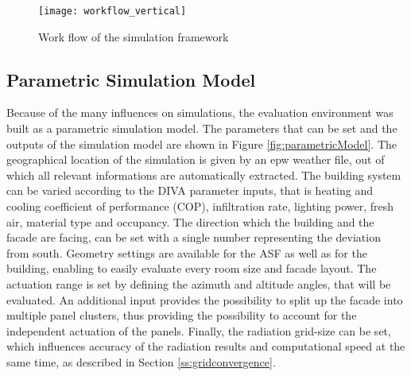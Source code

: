 
			\begin{figure}[ht] %
				\begin{center}
				\texttt{[image: workflow\_vertical]}
				\caption{Work flow of the simulation framework}
				\label{fig:workflow}
				\end{center} 
			\end{figure}

			

		\subsection{Parametric Simulation Model}

			Because of the many influences on simulations, the evaluation environment was built as a parametric simulation model. The parameters that can be set and the outputs of the simulation model are shown in Figure \ref{fig:parametricModel}. The geographical location of the simulation is given by an epw weather file, out of which all relevant informations are automatically extracted. The building system can be varied according to the DIVA parameter inputs, that is heating and cooling coefficient of performance (COP), infiltration rate, lighting power, fresh air, material type and occupancy. The direction which the building and the facade are facing, can be set with a single number representing the deviation from south. Geometry settings are available for the ASF as well as for the building, enabling to easily evaluate every room size and facade layout. The actuation range is set by defining the azimuth and altitude angles, that will be evaluated. An additional input provides the possibility to split up the facade into multiple panel clusters, thus providing the possibility to account for the independent actuation of the panels. Finally, the radiation grid-size can be set, which influences accuracy of the radiation results and computational speed at the same time, as described in Section \ref{ss:gridconvergence}. 

